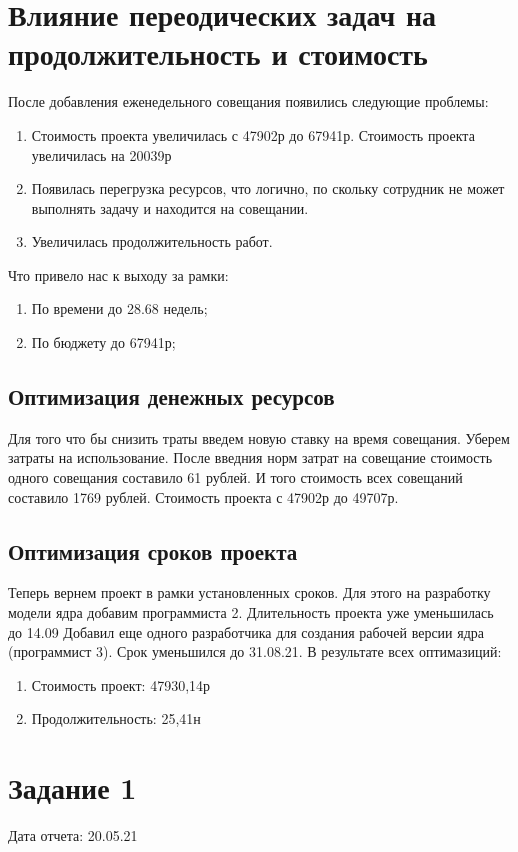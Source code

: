 \section{Влияние переодических задач на продолжительность и стоимость}

После добавления еженедельного совещания появились следующие проблемы:
\begin{enumerate}
	\item Стоимость проекта увеличилась с 47902р до 67941р. Стоимость проекта увеличилась на 20039р
	\item Появилась перегрузка ресурсов, что логично, по скольку сотрудник не может выполнять задачу и находится на совещании.
	\item Увеличилась продолжительность работ.
\end{enumerate}

Что привело нас к выходу за рамки:
\begin{enumerate}
	\item По времени до 28.68 недель;
	\item По бюджету до 67941р;
\end{enumerate}

\subsection{Оптимизация денежных ресурсов}
Для того что бы снизить траты введем новую ставку на время совещания.
Уберем затраты на использование.
После введния норм затрат на совещание стоимость одного совещания составило 61 рублей.
И того стоимость всех совещаний составило 1769 рублей.
Стоимость проекта с 47902р до 49707р.


\subsection{Оптимизация сроков проекта}
Теперь вернем проект в рамки установленных сроков.
Для этого на разработку модели ядра добавим программиста 2. Длительность проекта уже уменьшилась до 14.09
Добавил еще одного разработчика для создания рабочей версии ядра (программист 3). Срок уменьшился до 31.08.21.
В результате всех оптимазиций:
\begin{enumerate}
	\item Стоимость проект: 47930,14р
	\item Продолжительность: 25,41н 
\end{enumerate}


\section{Задание 1}
Дата отчета: 20.05.21


